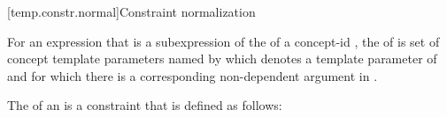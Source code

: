 \documentclass{wg21}
\begin{document}
[temp.constr.normal]{Constraint normalization}
%

%

\begin{addedblock}
%
For an expression  that is a subexpression of the  of a concept-id ,
the  of  is set of concept template parameters named by 
which denotes a template parameter of  and for which there is a corresponding non-dependent argument in .

\end{addedblock}

\pnum
The  of an   is
a constraint  that is defined as follows:
\end{document}
